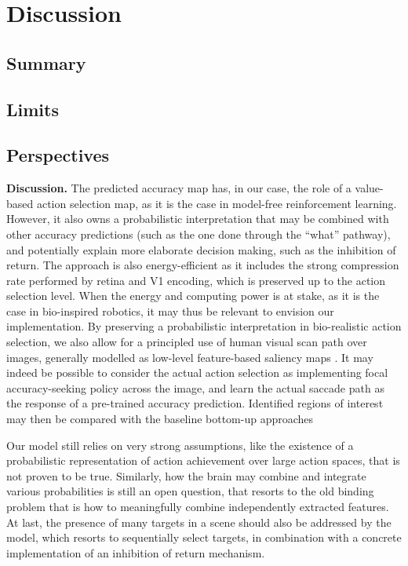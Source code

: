 \CNS
\section{Discussion}
\label{sec:discussion}

\subsection{Summary}

\subsection{Limits}

\subsection{Perspectives}
\else
\textbf{Discussion. }
The predicted accuracy map has, in our case, the role of a value-based action selection map, as it is the case in model-free reinforcement learning. However, it also owns a probabilistic interpretation that may be combined with other accuracy predictions (such as the one done through the ``what'' pathway), and potentially explain more elaborate decision making, such as the inhibition of return. The approach is also energy-efficient as it includes the strong compression rate performed by retina and V1 encoding, which is preserved up to the action selection level. When the energy and computing power is at stake, as it is the case in bio-inspired robotics, it may thus be relevant to envision our implementation. By preserving a probabilistic interpretation in bio-realistic action selection, we also allow for a principled use of human visual scan path over images, generally modelled as low-level feature-based saliency maps \cite{Itti01}. It may indeed be possible to consider the actual action selection as implementing focal accuracy-seeking policy across the image, and learn the actual saccade path as the response of a pre-trained accuracy prediction. Identified regions of interest may then be compared with the baseline bottom-up approaches

Our model still relies on very strong assumptions, like the existence of a probabilistic representation of action achievement over large action spaces, that is not proven to be true. Similarly, how the brain may combine and integrate various probabilities is still an open question, that resorts to the old binding problem that is how to meaningfully combine independently extracted features. At last, the presence of many targets in a scene should also be addressed by the model, which resorts to sequentially select targets, in combination with a concrete implementation of an inhibition of return mechanism.   

\fi
